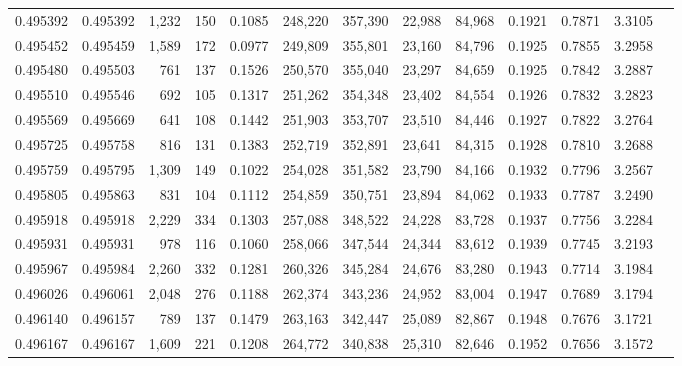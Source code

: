 \begin{tabular}{rrrrrrrrrrrrr}
0.495392 & 0.495392 & 1,232 &   150 &                                     0.1085 & 248,220 & 357,390 &  22,988 &  84,968 & 0.1921 & 0.7871 & 3.3105 \\
0.495452 & 0.495459 & 1,589 &   172 &                                     0.0977 & 249,809 & 355,801 &  23,160 &  84,796 & 0.1925 & 0.7855 & 3.2958 \\
0.495480 & 0.495503 &   761 &   137 &                                     0.1526 & 250,570 & 355,040 &  23,297 &  84,659 & 0.1925 & 0.7842 & 3.2887 \\
0.495510 & 0.495546 &   692 &   105 &                                     0.1317 & 251,262 & 354,348 &  23,402 &  84,554 & 0.1926 & 0.7832 & 3.2823 \\
0.495569 & 0.495669 &   641 &   108 &                                     0.1442 & 251,903 & 353,707 &  23,510 &  84,446 & 0.1927 & 0.7822 & 3.2764 \\
0.495725 & 0.495758 &   816 &   131 &                                     0.1383 & 252,719 & 352,891 &  23,641 &  84,315 & 0.1928 & 0.7810 & 3.2688 \\
0.495759 & 0.495795 & 1,309 &   149 &                                     0.1022 & 254,028 & 351,582 &  23,790 &  84,166 & 0.1932 & 0.7796 & 3.2567 \\
0.495805 & 0.495863 &   831 &   104 &                                     0.1112 & 254,859 & 350,751 &  23,894 &  84,062 & 0.1933 & 0.7787 & 3.2490 \\
0.495918 & 0.495918 & 2,229 &   334 &                                     0.1303 & 257,088 & 348,522 &  24,228 &  83,728 & 0.1937 & 0.7756 & 3.2284 \\
0.495931 & 0.495931 &   978 &   116 &                                     0.1060 & 258,066 & 347,544 &  24,344 &  83,612 & 0.1939 & 0.7745 & 3.2193 \\
0.495967 & 0.495984 & 2,260 &   332 &                                     0.1281 & 260,326 & 345,284 &  24,676 &  83,280 & 0.1943 & 0.7714 & 3.1984 \\
0.496026 & 0.496061 & 2,048 &   276 &                                     0.1188 & 262,374 & 343,236 &  24,952 &  83,004 & 0.1947 & 0.7689 & 3.1794 \\
0.496140 & 0.496157 &   789 &   137 &                                     0.1479 & 263,163 & 342,447 &  25,089 &  82,867 & 0.1948 & 0.7676 & 3.1721 \\
0.496167 & 0.496167 & 1,609 &   221 &                                     0.1208 & 264,772 & 340,838 &  25,310 &  82,646 & 0.1952 & 0.7656 & 3.1572 \\

\end{tabular}
